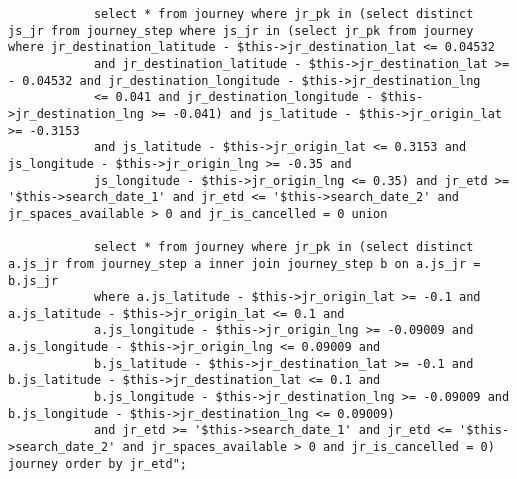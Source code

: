 \begin{verbatim}
            select * from journey where jr_pk in (select distinct js_jr from journey_step where js_jr in (select jr_pk from journey where jr_destination_latitude - $this->jr_destination_lat <= 0.04532
            and jr_destination_latitude - $this->jr_destination_lat >= - 0.04532 and jr_destination_longitude - $this->jr_destination_lng
            <= 0.041 and jr_destination_longitude - $this->jr_destination_lng >= -0.041) and js_latitude - $this->jr_origin_lat >= -0.3153
            and js_latitude - $this->jr_origin_lat <= 0.3153 and js_longitude - $this->jr_origin_lng >= -0.35 and
            js_longitude - $this->jr_origin_lng <= 0.35) and jr_etd >= '$this->search_date_1' and jr_etd <= '$this->search_date_2' and jr_spaces_available > 0 and jr_is_cancelled = 0 union
                
            select * from journey where jr_pk in (select distinct a.js_jr from journey_step a inner join journey_step b on a.js_jr = b.js_jr 
            where a.js_latitude - $this->jr_origin_lat >= -0.1 and a.js_latitude - $this->jr_origin_lat <= 0.1 and 
            a.js_longitude - $this->jr_origin_lng >= -0.09009 and a.js_longitude - $this->jr_origin_lng <= 0.09009 and 
            b.js_latitude - $this->jr_destination_lat >= -0.1 and b.js_latitude - $this->jr_destination_lat <= 0.1 and 
            b.js_longitude - $this->jr_destination_lng >= -0.09009 and b.js_longitude - $this->jr_destination_lng <= 0.09009)
            and jr_etd >= '$this->search_date_1' and jr_etd <= '$this->search_date_2' and jr_spaces_available > 0 and jr_is_cancelled = 0) journey order by jr_etd";
\end{verbatim}



